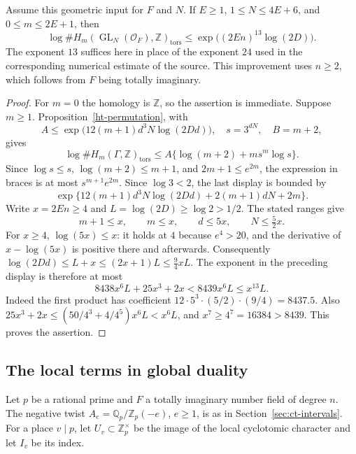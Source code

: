 \begin{proposition}\label{ht-arithmetic-numerical}
Assume this geometric input for $F$ and $N$.
If $E\ge1$, $1\le N\le4E+6$, and $0\le m\le2E+1$, then
\begin{equation}\label{ht-power-thirteen}
 \log\#H_m(\operatorname{GL}_N(\mathcal O_F),\mathbb Z)_{\mathrm{tors}}
       \le \exp\bigl((2En)^{13}\log(2D)\bigr).
\end{equation}
The exponent $13$ suffices here in place of the exponent $24$
used in the corresponding numerical estimate of the source.
This improvement uses $n\ge2$, which follows from $F$ being
totally imaginary.
\end{proposition}
\begin{proof}
For $m=0$ the homology is $\mathbb Z$, so the assertion is
immediate.  Suppose $m\ge1$.  Proposition~\ref{ht-permutation},
with
\[
 A\le\exp\bigl(12(m+1)d^3N\log(2Dd)\bigr),\quad
 s=3^{dN},\quad B=m+2,
\]
gives
\[
 \log\#H_m(\Gamma,\mathbb Z)_{\mathrm{tors}}
 \le A\{\log(m+2)+m s^m\log s\}.
\]
Since $\log s\le s$, $\log(m+2)\le m+1$, and
$2m+1\le e^{2m}$, the expression in braces is at most
$s^{m+1}e^{2m}$.  Since $\log3<2$, the last display is bounded by
\[
 \exp\{12(m+1)d^3N\log(2Dd)+2(m+1)dN+2m\}.
\]
Write $x=2En\ge4$ and $L=\log(2D)\ge\log2>1/2$.
The stated ranges give
\[
 m+1\le x,\qquad m\le x,\qquad
 d\le5x,\qquad N\le\tfrac52x.
\]
For $x\ge4$, $\log(5x)\le x$: it holds at $4$
because $e^4>20$, and the derivative of $x-\log(5x)$
is positive there and afterwards.  Consequently
$\log(2Dd)\le L+x\le(2x+1)L\le\tfrac94xL$.
The exponent in the preceding display is therefore at most
\[
 8438x^6L+25x^3+2x
       <8439x^6L\le x^{13}L.
\]
Indeed the first product has coefficient
$12\cdot5^3\cdot(5/2)\cdot(9/4)=8437.5$.
Also
$25x^3+2x\le(50/4^3+4/4^5)x^6L<x^6L$,
and $x^7\ge4^7=16384>8439$.  This proves the assertion.
\end{proof}

\subsection{The local terms in global duality}

Let $p$ be a rational prime and $F$ a totally imaginary number
field of degree $n$.  The negative twist
$A_e=\mathbb Q_p/\mathbb Z_p(-e)$, $e\ge1$, is as in
Section~\ref{sec:ct-intervals}.  For a place $v\mid p$, let
$U_v\subset\mathbb Z_p^\times$ be the image of the local
cyclotomic character and let $I_v$ be its index.

